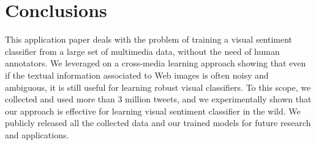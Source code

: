 
\section{Conclusions}
\label{sec:vsa:conclusion}

This application paper deals with the problem of
training a visual sentiment classifier from a large set of multimedia data, without the need of human annotators.
We leveraged on a cross-media learning approach showing that even if the textual information associated to Web images is often noisy and ambiguous, it is still useful for learning robust visual classifiers. %
To this scope, we collected and used more than 3 million tweets, and we experimentally shown that our approach is effective for learning visual sentiment classifier in the wild.
We publicly released all the collected data and our trained models for future research and applications.%


